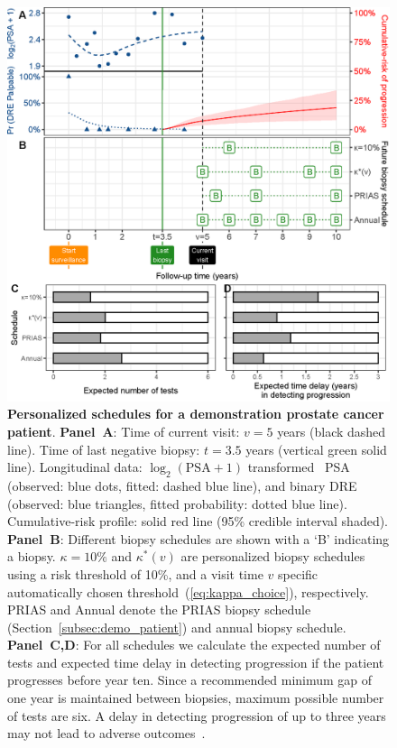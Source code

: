 \begin{figure}
\centerline{\includegraphics{images/demo_schedule.eps}}
\caption{\textbf{Personalized schedules for a demonstration prostate cancer patient}. \textbf{Panel~A}: Time of current visit: $v=5$ years (black dashed line). Time of last negative biopsy: $t=3.5$ years (vertical green solid line). Longitudinal data: $\log_2(\mbox{PSA} + 1)$ transformed~\citep{tomer2019personalized} PSA (observed: blue dots, fitted: dashed blue line), and binary DRE (observed: blue triangles, fitted probability: dotted blue line). Cumulative-risk profile: solid red line (95\% credible interval shaded). \textbf{Panel~B}: Different biopsy schedules are shown with a `B' indicating a biopsy. \textbf{$\kappa=10\%$} and \textbf{$\kappa^*(v)$} are personalized biopsy schedules using a risk threshold of 10\%, and a visit time $v$ specific automatically chosen threshold~(\ref{eq:kappa_choice}), respectively. PRIAS and Annual denote the PRIAS biopsy schedule (Section~\ref{subsec:demo_patient}) and annual biopsy schedule. \textbf{Panel~C,D}: For all schedules we calculate the expected number of tests and expected time delay in detecting progression if the patient progresses before year ten. Since a recommended minimum gap of one year is maintained between biopsies, maximum possible number of tests are six. A delay in detecting progression of up to three years may not lead to adverse outcomes~\citep{carvalho}. }
\label{fig:demo_schedule}
\end{figure}


